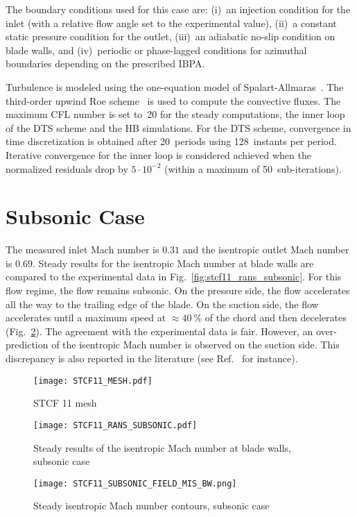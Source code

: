 The boundary conditions used for this case are: (i)~an
injection condition  for the inlet (with a relative flow angle
set to the  experimental value), (ii)~a constant static pressure
condition for the outlet,  (iii)~an adiabatic no-slip condition on
blade walls, and (iv)~periodic or phase-lagged conditions for azimuthal boundaries depending on the  
prescribed IBPA.

Turbulence is modeled using the one-equation model of
Spalart-Allmaras~\cite{Spalart1992}.  The third-order upwind Roe
scheme~\cite{Roe1981} is used to compute the convective fluxes.
The maximum
CFL number is set to~20 for the steady computations,  the inner loop
of the DTS scheme and the HB simulations.  For the DTS scheme,  
convergence in time discretization is obtained
after 20~periods using 128~instants per period.  Iterative convergence 
for the inner loop is considered achieved when the normalized
residuals drop by $5\cdot 10^{-2}$ (within a maximum of
50~sub-iterations).

\section{Subsonic Case}
The measured inlet Mach number is $0.31$ and the isentropic outlet Mach number is $0.69$.
Steady results for the isentropic Mach number at blade walls are compared to the experimental data in 
Fig.~\ref{fig:stcf11_rans_subsonic}.  For this flow regime, the flow
remains subsonic.
On the pressure side, the flow accelerates all the way
to the trailing edge of the blade. On the suction side, the flow
accelerates until a maximum speed at $\approx 40~\%$ of the chord and
then decelerates (Fig.~\ref{fig:stcf11_subsonic_field_mis_bw}).
The agreement with the experimental data is fair. However, an
over-prediction of the isentropic Mach number is observed on the suction
side.  This discrepancy is also reported in the literature (see
Ref.~\cite{Fransson:1999uq} for instance).
\begin{figure}[htb]
  \centering
  \texttt{[image: STCF11\_MESH.pdf]}
  \caption{STCF 11 mesh}
  \label{fig:stcf11_mesh}
\end{figure}

\begin{figure}[htb]
  \centering
  \begin{minipage}[b]{.46\linewidth}
    \centering
    \texttt{[image: STCF11\_RANS\_SUBSONIC.pdf]}
    \caption{Steady results of the isentropic Mach number at blade
      walls, subsonic case}
    \label{fig:stcf11_rans_subsonic}
  \end{minipage}\quad
  \begin{minipage}[b]{.46\linewidth}
    \centering
    \texttt{[image: STCF11\_SUBSONIC\_FIELD\_MIS\_BW.png]}
    \caption{Steady isentropic Mach number contours, subsonic case}
    \label{fig:stcf11_subsonic_field_mis_bw}
  \end{minipage}
\end{figure}

